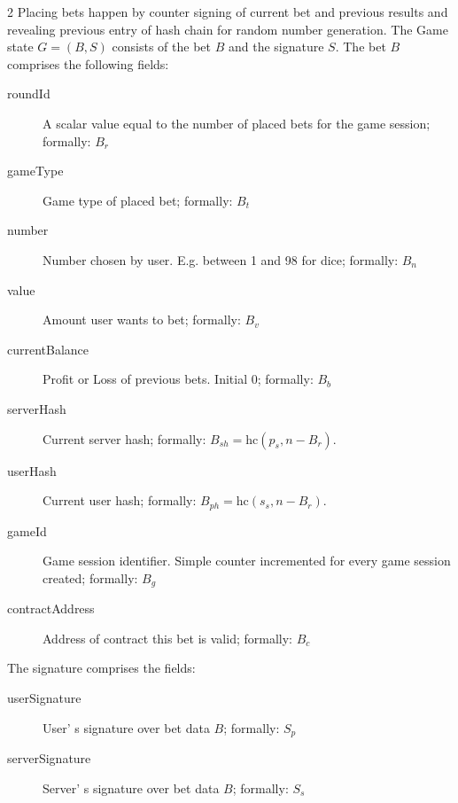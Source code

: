 \documentclass[oneside]{amsart}
\makeatletter
\newcommand*\Eg{E.g.\@\xspace}
\makeatother
\begin{document}
\begin{multicols}{2}
Placing bets happen by counter signing of current bet and previous results and revealing previous entry of
hash chain for random number generation.
The Game state $G = (B, S)$ consists of the bet $B$ and the signature $S$.
The bet $B$ comprises the following fields:
\begin{description}
    \item[roundId] A scalar value equal to the number of placed bets for the game session; formally: $B_r$
    \item[gameType] Game type of placed bet; formally: $B_t$
    \item[number] Number chosen by user. \Eg between 1 and 98 for dice; formally: $B_n$
    \item[value] Amount user wants to bet; formally: $B_v$
    \item[currentBalance] Profit or Loss of previous bets. Initial 0; formally: $B_b$
    \item[serverHash] Current server hash; formally: $B_{sh} = \text{hc}(p_s, n - B_r)$.
    \item[userHash] Current user hash; formally: $B_{ph} = \text{hc}(s_s, n - B_r)$.
    \item[gameId] Game session identifier. Simple counter incremented for every game session created; formally: $B_{g}$
    \item[contractAddress] Address of contract this bet is valid; formally: $B_{c}$
\end{description}
The signature comprises the fields:
\begin{description}
    \item[userSignature] User' s signature over bet data $B$; formally: $S_p$
    \item[serverSignature] Server' s signature over bet data $B$; formally: $S_s$
\end{description}


\end{multicols}
\end{document}
